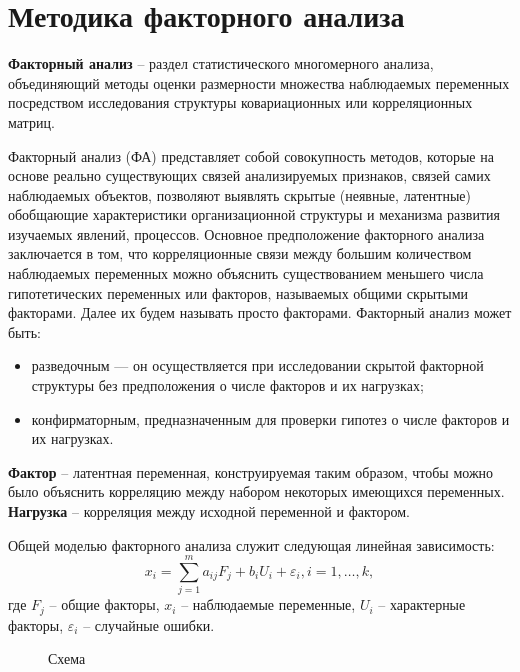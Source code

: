 \documentclass[a4paper, 12pt]{article}
\begin{document}
\section{Методика факторного анализа}

\textbf{Факторный анализ} -- раздел статистического многомерного анализа, объединяющий методы оценки размерности множества наблюдаемых переменных посредством исследования структуры ковариационных или корреляционных матриц.

Факторный анализ (ФА) представляет собой совокупность методов, которые на основе реально существующих связей анализируемых признаков, связей самих наблюдаемых объектов, позволяют выявлять скрытые (неявные, латентные) обобщающие характеристики организационной структуры и механизма развития изучаемых явлений, процессов. Основное предположение факторного анализа заключается в том, что корреляционные связи между большим количеством наблюдаемых переменных можно объяснить существованием меньшего числа гипотетических переменных или факторов, называемых общими скрытыми факторами. Далее их будем называть просто факторами.
Факторный анализ может быть:
\begin{itemize}
    \item разведочным — он осуществляется при исследовании скрытой факторной структуры без предположения о числе факторов и их нагрузках;
    \item конфирматорным, предназначенным для проверки гипотез о числе факторов и их нагрузках.
\end{itemize}

\textbf{Фактор} – латентная переменная, конструируемая таким образом, чтобы можно было объяснить корреляцию между набором некоторых имеющихся переменных.
\textbf{Нагрузка} – корреляция между исходной переменной и фактором.

Общей моделью факторного анализа служит следующая линейная зависимость:
\begin{equation}
    x_i = \sum_{j=1}^m a_{i j} F_j+ b_i U_i + \varepsilon_i, i = 1, \dots, k,
\end{equation}
где $F_j$ -- общие факторы, $x_i$ -- наблюдаемые переменные, $U_i$ -- характерные факторы, $ \varepsilon_i$ -- случайные ошибки.

\begin{figure}[h!]
    \caption{Схема}
    \label{ris:image}
    \end{figure}
\end{document}

